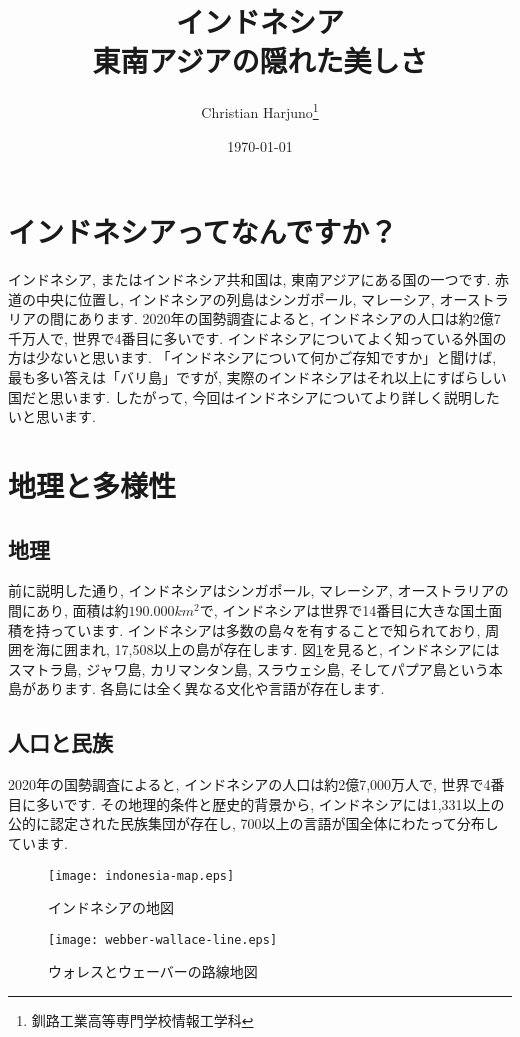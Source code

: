 \documentclass[a4j, twocolumn]{jarticle}
\begin{document}
  \title{インドネシア \\\large 東南アジアの隠れた美しさ}
  \author{Christian Harjuno\thanks{釧路工業高等専門学校情報工学科}}
  \date{\today}
  \maketitle
  \section{インドネシアってなんですか？}
  インドネシア, またはインドネシア共和国は, 東南アジアにある国の一つです. 赤道の中央に位置し, インドネシアの列島はシンガポール, マレーシア, オーストラリアの間にあります. 2020年の国勢調査によると, インドネシアの人口は約2億7千万人で, 世界で4番目に多いです. 
  インドネシアについてよく知っている外国の方は少ないと思います. 「インドネシアについて何かご存知ですか」と聞けば, 最も多い答えは「バリ島」ですが, 実際のインドネシアはそれ以上にすばらしい国だと思います. したがって, 今回はインドネシアについてより詳しく説明したいと思います. 
  \section{地理と多様性}
  \subsection{地理}
  前に説明した通り, インドネシアはシンガポール, マレーシア, オーストラリアの間にあり, 面積は約$190.000 km^2$で, インドネシアは世界で14番目に大きな国土面積を持っています. インドネシアは多数の島々を有することで知られており, 周囲を海に囲まれ, 17,508以上の島が存在します\cite{ANDREFOUET2022104848}. 図\ref{indonesiamap}を見ると, インドネシアにはスマトラ島, ジャワ島, カリマンタン島, スラウェシ島, そしてパプア島という本島があります. 各島には全く異なる文化や言語が存在します.\\
  \subsection{人口と民族}
  2020年の国勢調査によると, インドネシアの人口は約2億7,000万人で, 世界で4番目に多いです\cite{unstats2023}. その地理的条件と歴史的背景から, インドネシアには1,331以上の公的に認定された民族集団が存在し, 700以上の言語が国全体にわたって分布しています.\\
  \begin{figure}
    \centering
    \texttt{[image: indonesia-map.eps]}
    \caption{インドネシアの地図}\label{indonesiamap}
  \end{figure}
  \begin{figure}
    \centering
    \texttt{[image: webber-wallace-line.eps]}
    \caption{ウォレスとウェーバーの路線地図}\label{wallaceweber}
  \end{figure}
\end{document}
